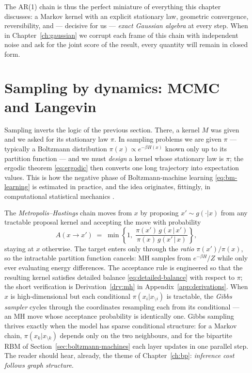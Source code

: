 The AR(1) chain is thus the perfect miniature of everything this chapter
discusses: a Markov kernel with an explicit stationary law, geometric
convergence, reversibility, and --- decisive for us --- \emph{exact Gaussian
algebra} at every step. When in Chapter~\ref{ch:gaussian} we corrupt each
frame of this chain with independent noise and ask for the joint score of
the result, every quantity will remain in closed form.

\section{Sampling by dynamics: MCMC and Langevin}\label{sec:mcmc}

Sampling inverts the logic of the previous section. There, a kernel $M$ was
given and we asked for its stationary law $\pi$. In sampling problems we are
given $\pi$ --- typically a Boltzmann distribution
$\pi(x) \propto e^{-\beta H(x)}$ known only up to its partition function ---
and we must \emph{design} a kernel whose stationary law is $\pi$; the
ergodic theorem \eqref{eq:ergodic} then converts one long trajectory into
expectation values. This is how the negative phase of Boltzmann-machine
learning \eqref{eq:bm-learning} is estimated in practice, and the idea
originates, fittingly, in computational statistical mechanics
\citep{metropolis1953equation}.

The \emph{Metropolis--Hastings} chain \citep{metropolis1953equation,
hastings1970monte} moves from $x$ by proposing $x' \sim g(\cdot|x)$ from any
tractable proposal kernel and accepting the move with probability
\begin{equation}
  A(x \to x') \;=\; \min\!\left\{ 1,\;
    \frac{\pi(x')\, g(x \,|\, x')}{\pi(x)\, g(x' \,|\, x)}
  \right\},
  \label{eq:mh-acceptance}
\end{equation}
staying at $x$ otherwise. The target enters only through the \emph{ratio}
$\pi(x')/\pi(x)$, so the intractable partition function cancels: MH samples
from $e^{-\beta H}/Z$ while only ever evaluating energy differences. The
acceptance rule is engineered so that the resulting kernel satisfies
detailed balance \eqref{eq:detailed-balance} with respect to $\pi$; the
short verification is Derivation~\ref{drv:mh} in
Appendix~\ref{app:derivations}. When $x$ is high-dimensional but each
conditional $\pi(x_i | x_{\setminus i})$ is tractable, the \emph{Gibbs
sampler} \citep{geman1984stochastic} cycles through the coordinates
resampling each from its conditional --- an MH move whose acceptance
probability is identically one. Gibbs sampling thrives exactly when the
model has sparse conditional structure: for a Markov chain,
$\pi(x_k | x_{\setminus k})$ depends only on the two neighbours, and for the
bipartite RBM of Section~\ref{sec:boltzmann-machines} each layer updates in
one parallel step. The reader should hear, already, the theme of
Chapter~\ref{ch:bp}: \emph{inference cost follows graph structure}.

